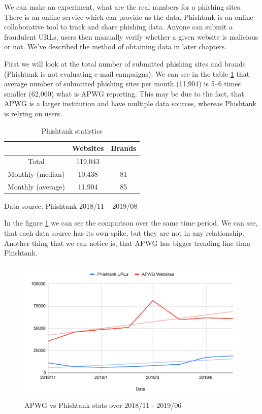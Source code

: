 \documentclass[
  digital, %
  oneside, %
  table,   %
  nolof,     %
  nolot,     %
]{fithesis3}
\begin{document}
We can make an experiment, what are the real numbers for a phishing sites. There is an online service which can provide us the data. Phishtank \cite{phishtank} is an online collaborative tool to track and share phishing data. Anyone can submit a fraudulent URLs, users then manually verify whether a given website is malicious or not. We've described the method of obtaining data in later chapters. 

First we will look at the total number of submitted phishing sites and brands (Phishtank is not evaluating e-mail campaigns). We can see in the table \ref{table:phishtank-stats} that average number of submitted phishing sites per month (11,904) is 5--6 times smaller (62,060) what is APWG reporting. This may be due to the fact, that APWG is a larger institution and have multiple data sources, whereas Phishtank is relying on users.

\begin{table}[h!]
\begin{tabular}{ccc}
\hline
                  & Websites & Brands \\ \hline
Total             & 119,043   &        \\
Monthly (median)  & 10,438    & 81   \\
Monthly (average) & 11,904    & 85   \\ \hline
\end{tabular} \par
\caption{Phishtank statistics} 
\bigskip
Data source: Phishtank 2018/11 -- 2019/08
\label{table:phishtank-stats}
\end{table}


In the figure \ref{fig:apwg-vs-phishtank} we can see the comparison over the same time period. We can see, that each data source has its own spike, but they are not in any relationship. Another thing that we can notice is, that APWG has bigger trending line than Phishtank.

\begin{figure}[h!]
  \begin{center}
    \includegraphics[width=12cm]{images/apwg-vs-phishtank.pdf}
    \caption{APWG vs Phishtank stats over 2018/11 - 2019/06}
    \label{fig:apwg-vs-phishtank}
  \end{center}
\end{figure}
\end{document}
